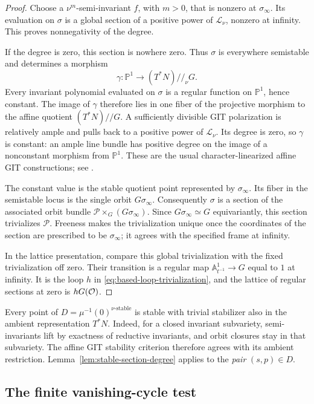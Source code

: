 \begin{proof}
Choose a $\nu^m$-semi-invariant $f$, with $m>0$, that is nonzero at
$\sigma_\infty$.
Its evaluation on $\sigma$ is a global section of a positive power of
$\mathcal L_\nu$, nonzero at infinity.  This proves nonnegativity of the
degree.

If the degree is zero, this section is nowhere zero.  Thus $\sigma$ is
everywhere semistable and determines a morphism
\[
 \gamma:\mathbb P^1\longrightarrow (T^*N)/\!/_{\nu}G.
\]
Every invariant polynomial evaluated on $\sigma$ is a regular function
on $\mathbb P^1$, hence constant.  The image of $\gamma$ therefore lies
in one fiber of the projective morphism to the affine quotient
$(T^*N)/\!/G$.  A sufficiently divisible GIT polarization is relatively
ample and pulls back to a positive power of $\mathcal L_\nu$.  Its
degree is zero, so $\gamma$ is constant: an ample line bundle has
positive degree on the image of a nonconstant morphism from
$\mathbb P^1$.  These are the usual character-linearized affine GIT
constructions; see \cite[Section~2]{King94}.

The constant value is the stable quotient point represented by
$\sigma_\infty$.  Its fiber in the semistable locus is the single orbit
$G\sigma_\infty$.  Consequently $\sigma$ is a section of the associated
orbit bundle $\mathcal P\times_G(G\sigma_\infty)$.  Since
$G\sigma_\infty\simeq G$ equivariantly, this section trivializes
$\mathcal P$.  Freeness makes the trivialization unique once the
coordinates of the section are prescribed to be $\sigma_\infty$; it
agrees with the specified frame at infinity.

In the lattice presentation, compare this global trivialization with the
fixed trivialization off zero.  Their transition is a regular map
$\mathbb A^1_{t^{-1}}\to G$ equal to $1$ at infinity.  It is the loop $h$
in \eqref{eq:based-loop-trivialization}, and the lattice of regular
sections at zero is $hG(\mathcal O)$.
\end{proof}

Every point of $D=\mu^{-1}(0)^{\nu\text{-stable}}$ is stable with trivial
stabilizer also in the ambient representation $T^*N$.  Indeed, for a
closed invariant subvariety, semi-invariants lift by exactness of
reductive invariants, and orbit closures stay in that subvariety.
The affine GIT stability criterion therefore agrees with its ambient
restriction.  Lemma~\ref{lem:stable-section-degree} applies to the
\emph{pair} $(s,p)\in D$.

\subsection{The finite vanishing-cycle test}

